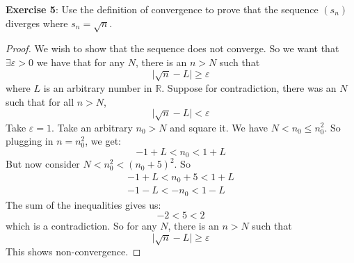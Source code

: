 \documentclass{article}
\begin{document}
\textbf{Exercise 5}: Use the definition of convergence to prove that the sequence $(s_{n})$ diverges where $s_{n} = \sqrt{n}$.
    \begin{proof}
        We wish to show that the sequence does not converge. So we want that $\exists \varepsilon > 0$ we have that for any $N$, there is an $n > N$ such that 
            \begin{equation*}
                \lvert \sqrt{n} - L \rvert \geq \varepsilon
            \end{equation*}
        where $L$ is an arbitrary number in $\mathbb{R}$. Suppose for contradiction, there was an $N$ such that for all $n > N$, 
            \begin{equation*}
                \lvert \sqrt{n} - L \rvert < \varepsilon
            \end{equation*}
        Take $\varepsilon = 1$. Take an arbitrary $n_{0} > N$ and square it. We have $N < n_{0} \leq n_{0}^{2}$. So plugging in $n = n_{0}^{2}$, we get:
            \begin{equation*}
                -1 + L < n_{0} < 1 + L
            \end{equation*}
        But now consider $N < n_{0}^{2} < (n_{0} + 5)^{2}$. So
            \begin{align*}
                -1 + L < n_{0} + 5 < 1 + L \\
                -1 - L < -n_{0} < 1 - L
            \end{align*}
        The sum of the inequalities gives us:
            \begin{equation*}
                -2 < 5 < 2
            \end{equation*}
        which is a contradiction. So for any $N$, there is an $n > N$ such that
            \begin{equation*}
                \lvert \sqrt{n} - L \rvert \geq \varepsilon
            \end{equation*}
        This shows non-convergence.
    \end{proof}
\end{document}
